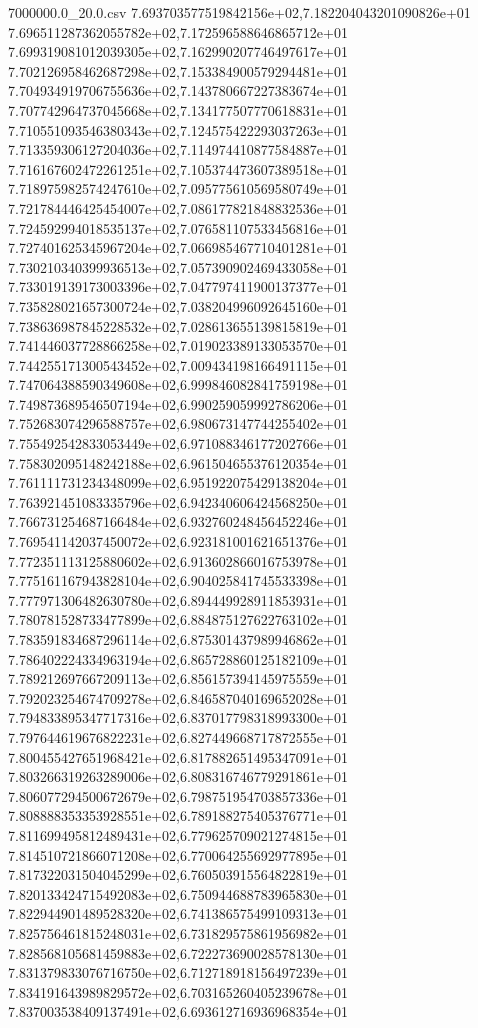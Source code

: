 \begin{filecontents*}{7000000.0_20.0.csv}
7.693703577519842156e+02,7.182204043201090826e+01
7.696511287362055782e+02,7.172596588646865712e+01
7.699319081012039305e+02,7.162990207746497617e+01
7.702126958462687298e+02,7.153384900579294481e+01
7.704934919706755636e+02,7.143780667227383674e+01
7.707742964737045668e+02,7.134177507770618831e+01
7.710551093546380343e+02,7.124575422293037263e+01
7.713359306127204036e+02,7.114974410877584887e+01
7.716167602472261251e+02,7.105374473607389518e+01
7.718975982574247610e+02,7.095775610569580749e+01
7.721784446425454007e+02,7.086177821848832536e+01
7.724592994018535137e+02,7.076581107533456816e+01
7.727401625345967204e+02,7.066985467710401281e+01
7.730210340399936513e+02,7.057390902469433058e+01
7.733019139173003396e+02,7.047797411900137377e+01
7.735828021657300724e+02,7.038204996092645160e+01
7.738636987845228532e+02,7.028613655139815819e+01
7.741446037728866258e+02,7.019023389133053570e+01
7.744255171300543452e+02,7.009434198166491115e+01
7.747064388590349608e+02,6.999846082841759198e+01
7.749873689546507194e+02,6.990259059992786206e+01
7.752683074296588757e+02,6.980673147744255402e+01
7.755492542833053449e+02,6.971088346177202766e+01
7.758302095148242188e+02,6.961504655376120354e+01
7.761111731234348099e+02,6.951922075429138204e+01
7.763921451083335796e+02,6.942340606424568250e+01
7.766731254687166484e+02,6.932760248456452246e+01
7.769541142037450072e+02,6.923181001621651376e+01
7.772351113125880602e+02,6.913602866016753978e+01
7.775161167943828104e+02,6.904025841745533398e+01
7.777971306482630780e+02,6.894449928911853931e+01
7.780781528733477899e+02,6.884875127622763102e+01
7.783591834687296114e+02,6.875301437989946862e+01
7.786402224334963194e+02,6.865728860125182109e+01
7.789212697667209113e+02,6.856157394145975559e+01
7.792023254674709278e+02,6.846587040169652028e+01
7.794833895347717316e+02,6.837017798318993300e+01
7.797644619676822231e+02,6.827449668717872555e+01
7.800455427651968421e+02,6.817882651495347091e+01
7.803266319263289006e+02,6.808316746779291861e+01
7.806077294500672679e+02,6.798751954703857336e+01
7.808888353353928551e+02,6.789188275405376771e+01
7.811699495812489431e+02,6.779625709021274815e+01
7.814510721866071208e+02,6.770064255692977895e+01
7.817322031504045299e+02,6.760503915564822819e+01
7.820133424715492083e+02,6.750944688783965830e+01
7.822944901489528320e+02,6.741386575499109313e+01
7.825756461815248031e+02,6.731829575861956982e+01
7.828568105681459883e+02,6.722273690028578130e+01
7.831379833076716750e+02,6.712718918156497239e+01
7.834191643989829572e+02,6.703165260405239678e+01
7.837003538409137491e+02,6.693612716936968354e+01

\end{filecontents*}
